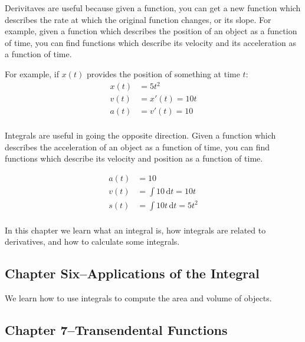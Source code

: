 \documentclass[fleqn, onecolumn]{article}
\begin{document}

Derivitaves are useful because given a function, you can get a new function which describes the rate at which the
original function changes, or its slope.  For example, given a function which describes the position of an object as a
function of time, you can find functions which describe its velocity and its acceleration as a function of time.

For example, if $x(t)$ provides the position of something at time $t$:
\begin{align*}
  x(t) &= 5t^2 \\
  v(t) &= x'(t) = 10t \\
  a(t) &= v'(t) = 10 \\
\end{align*}


Integrals are useful in going the opposite direction.  Given a function which describes the acceleration of an object as
a function of time, you can find functions which describe its velocity and position as a function of time.

\begin{align*}
  a(t) &= 10 \\
  v(t) &= \int 10 \, \mathrm{d}t = 10 t \\
  s(t) &= \int 10t \, \mathrm{d}t = 5t^2 \\
\end{align*}

In this chapter we learn what an integral is, how integrals are related to derivatives, and how to calculate some integrals.

\subsection{Chapter Six--Applications of the Integral}

We learn how to use integrals to compute the area and volume of objects.

\subsection{Chapter 7--Transendental Functions}
\end{document}
